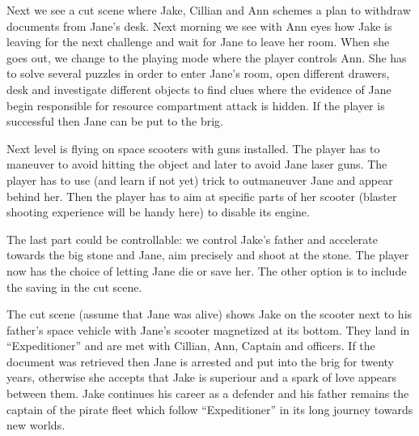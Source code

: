 \documentclass{article}
\begin{document}
Next we see a cut scene where Jake, Cillian and Ann schemes a plan to withdraw
documents from Jane's desk. Next morning we see with Ann eyes how Jake is
leaving for the next challenge and wait for Jane to leave her room. When she
goes out, we change to the playing mode where the player controls Ann. She has
to solve several puzzles in order to enter Jane's room, open different drawers,
desk and investigate different objects to find clues where the evidence of Jane
begin responsible for resource compartment attack is hidden. If the player is
successful then Jane can be put to the brig.

Next level is flying on space scooters with guns installed. The player has to
maneuver to avoid hitting the object and later to avoid Jane laser guns. The
player has to use (and learn if not yet) trick to outmaneuver Jane and appear
behind her. Then the player has to aim at specific parts of her scooter (blaster
shooting experience will be handy here) to disable its engine.

The last part could be controllable: we control Jake's father and accelerate
towards the big stone and Jane, aim precisely and shoot at the stone. The player
now has the choice of letting Jane die or save her. The other option is to
include the saving in the cut scene.

The cut scene (assume that Jane was alive) shows Jake on the scooter next to his
father's space vehicle with Jane's scooter magnetized at its bottom. They land
in ``Expeditioner'' and are met with Cillian, Ann, Captain and officers. If the
document was retrieved then Jane is arrested and put into the brig for twenty
years, otherwise she accepts that Jake is superiour and a spark of love appears
between them. Jake continues his career as a defender and his father remains the
captain of the pirate fleet which follow ``Expeditioner'' in its long journey
towards new worlds.
\end{document}
